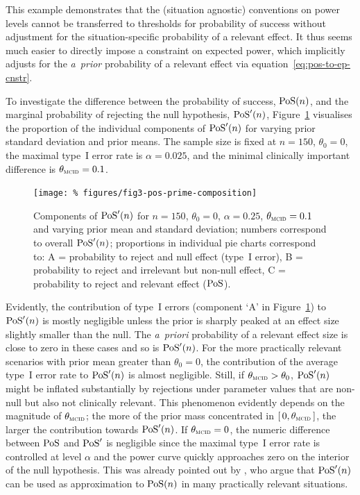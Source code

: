 \documentclass{article}
\begin{document}
This example demonstrates that the (situation agnostic) conventions on power levels cannot be transferred to thresholds for probability of success without adjustment for the situation-specific  probability of a relevant effect.
It thus seems much easier to directly impose a constraint on expected power, which implicitly adjusts for the \textit{a~prior} probability of a relevant effect via equation~\eqref{eq:pos-to-ep-cnstr}.

To investigate the difference between the probability of success, $\operatorname{PoS}(n)$, and the marginal probability of rejecting the null hypothesis, $\operatorname{PoS}'(n)$, Figure~\ref{fig:pos-components} visualises the proportion of the individual components of $\operatorname{PoS}'(n)$ for varying prior standard deviation and prior means.
The sample size is fixed at $n=150$, $\theta_0=0$, the maximal type~I error rate is $\alpha=0.025$, and the minimal clinically important difference is $\mcid=0.1$.
\begin{figure}
    \centering
    \texttt{[image: \%
        figures/fig3-pos-prime-composition]}
    \caption{Components of $\operatorname{PoS}'(n)$ for $n=150$, $\theta_0=0$, $\alpha=0.25$, $\mcid=0.1$ and varying prior mean and standard deviation;
    numbers correspond to overall $\operatorname{PoS}'(n)$;
    proportions in individual pie charts correspond to:
    A = probability to reject and null effect (type~I error),
    B = probability to reject and irrelevant but non-null effect,
    C = probability to reject and relevant effect ($\operatorname{PoS}$).}
    \label{fig:pos-components}
\end{figure}
Evidently, the contribution of type~I errors (component `A' in Figure~\ref{fig:pos-components}) to $\operatorname{PoS}'(n)$ is mostly negligible unless the prior is sharply peaked at an effect size slightly smaller than the null.
The \textit{a~priori} probability of a relevant effect size is close to zero in these cases and so is $\operatorname{PoS}'(n)$.
For the more practically relevant scenarios with prior mean greater than $\theta_0=0$, the contribution of the average type~I error rate to $\operatorname{PoS}'(n)$ is almost negligible.
Still, if $\mcid>\theta_0$, $\operatorname{PoS}'(n)$ might be inflated substantially by rejections under parameter values that are non-null but also not clinically relevant.
This phenomenon evidently depends on the magnitude of $\mcid$; the more of the prior mass concentrated in $[\,0,\mcid\,]$, the larger the contribution towards $\operatorname{PoS}'(n)$.
If $\mcid = 0$, the numeric difference between $\operatorname{PoS}$ and $\operatorname{PoS}'$ is negligible since the maximal type~I error rate is controlled at level $\alpha$ and the power curve quickly approaches zero on the interior of the null hypothesis.
This was already pointed out by \citet{spiegelhalter-2004},
who argue that $\operatorname{PoS}'(n)$ can be used as approximation to $\operatorname{PoS}(n)$ in many practically relevant situations.
\end{document}

